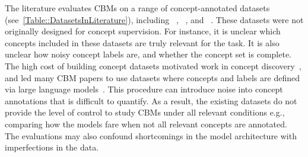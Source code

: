 \documentclass[11pt]{article}
\begin{document}

The literature evaluates CBMs on a range of concept-annotated datasets (see~\cref{Table::DatasetsInLiterature}), including ~\citep{wah2011cub}, ~\citep{liu2015faceattributes}, and ~\citep{irvin2019chexpert}. These datasets were not originally designed for concept supervision. For instance, it is unclear which concepts included in these datasets are truly relevant for the task. It is also unclear how noisy concept labels are, and whether the concept set is complete. The high cost of building concept datasets motivated work in concept discovery~\citep[e.g.,][]{rao2024discover, schrodi2024concept, panousis2024coarse, xie2025discovering}, and led many CBM papers to use datasets where concepts and labels are defined via large language models~\citep[as in, e.g.,][]{kim2023probabilistic, oikarinen2023label, yu2025language, yang2023language, zhang2025attribute, he2025v2c, jiang2025enhancing}. This procedure can introduce noise into concept annotations that is difficult to quantify. As a result, the existing datasets do not provide the level of control to study CBMs under all relevant conditions e.g., comparing how the models fare when not all relevant concepts are annotated. The evaluations may also confound shortcomings in the model architecture with imperfections in the data.
\end{document}
